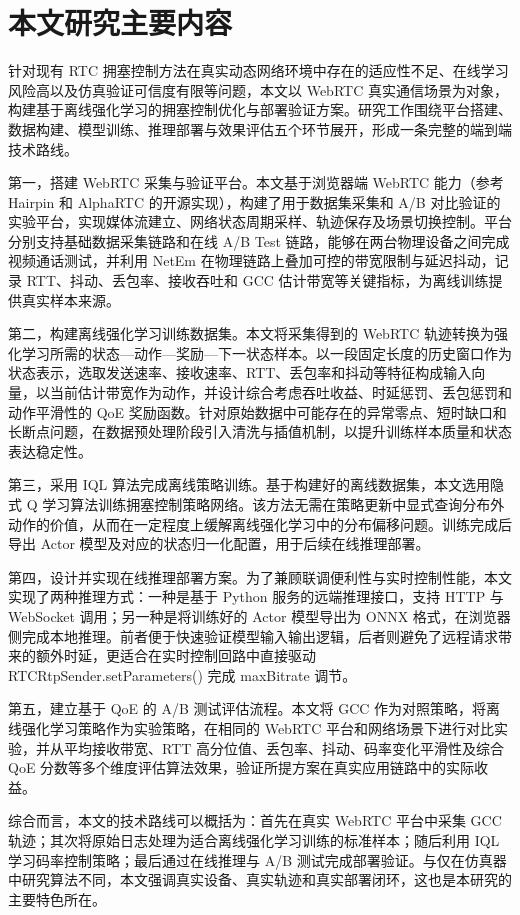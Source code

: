 \section{本文研究主要内容}
针对现有 RTC 拥塞控制方法在真实动态网络环境中存在的适应性不足、在线学习风险高以及仿真验证可信度有限等问题，本文以 WebRTC 真实通信场景为对象，构建基于离线强化学习的拥塞控制优化与部署验证方案。研究工作围绕平台搭建、数据构建、模型训练、推理部署与效果评估五个环节展开，形成一条完整的端到端技术路线。
\par 第一，搭建 WebRTC 采集与验证平台。本文基于浏览器端 WebRTC 能力（参考 Hairpin\cite{Meng2024Hairpin} 和 AlphaRTC\cite{AlphaRTC2021} 的开源实现），构建了用于数据集采集和 A/B 对比验证的实验平台，实现媒体流建立、网络状态周期采样、轨迹保存及场景切换控制。平台分别支持基础数据采集链路和在线 A/B Test 链路，能够在两台物理设备之间完成视频通话测试，并利用 NetEm\cite{Hemminger2005NetEm} 在物理链路上叠加可控的带宽限制与延迟抖动，记录 RTT、抖动、丢包率、接收吞吐和 GCC 估计带宽等关键指标，为离线训练提供真实样本来源。
\par 第二，构建离线强化学习训练数据集。本文将采集得到的 WebRTC 轨迹转换为强化学习所需的状态—动作—奖励—下一状态样本。以一段固定长度的历史窗口作为状态表示\cite{Bentaleb2023BoB,Tan2024Accurate}，选取发送速率、接收速率、RTT、丢包率和抖动等特征构成输入向量，以当前估计带宽作为动作，并设计综合考虑吞吐收益、时延惩罚、丢包惩罚和动作平滑性的 QoE 奖励函数。针对原始数据中可能存在的异常零点、短时缺口和长断点问题，在数据预处理阶段引入清洗与插值机制，以提升训练样本质量和状态表达稳定性。
\par 第三，采用 IQL 算法完成离线策略训练。基于构建好的离线数据集，本文选用隐式 Q 学习算法\cite{Kostrikov2021IQL}训练拥塞控制策略网络。该方法无需在策略更新中显式查询分布外动作的价值，从而在一定程度上缓解离线强化学习中的分布偏移问题。训练完成后导出 Actor 模型及对应的状态归一化配置，用于后续在线推理部署。
\par 第四，设计并实现在线推理部署方案。为了兼顾联调便利性与实时控制性能，本文实现了两种推理方式：一种是基于 Python 服务的远端推理接口，支持 HTTP 与 WebSocket 调用；另一种是将训练好的 Actor 模型导出为 ONNX 格式，在浏览器侧完成本地推理。前者便于快速验证模型输入输出逻辑，后者则避免了远程请求带来的额外时延，更适合在实时控制回路中直接驱动 RTCRtpSender.setParameters() 完成 maxBitrate 调节。
\par 第五，建立基于 QoE 的 A/B 测试评估流程。本文将 GCC\cite{Carlucci2016GCC} 作为对照策略，将离线强化学习策略作为实验策略，在相同的 WebRTC 平台和网络场景下进行对比实验，并从平均接收带宽、RTT 高分位值、丢包率、抖动、码率变化平滑性及综合 QoE 分数等多个维度评估算法效果，验证所提方案在真实应用链路中的实际收益。
\par 综合而言，本文的技术路线可以概括为：首先在真实 WebRTC 平台中采集 GCC 轨迹；其次将原始日志处理为适合离线强化学习训练的标准样本；随后利用 IQL 学习码率控制策略；最后通过在线推理与 A/B 测试完成部署验证。与仅在仿真器中研究算法不同，本文强调真实设备、真实轨迹和真实部署闭环，这也是本研究的主要特色所在。

